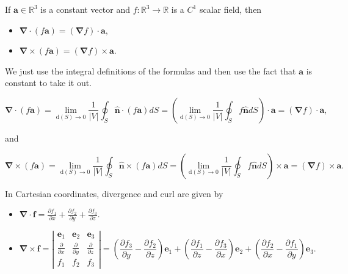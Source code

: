 \begin{lemma}
  If \(\boldsymbol{a} \in \mathbb{R}^3\) is a constant vector and \(f: \mathbb{R}^3 \rightarrow \mathbb{R}\) is a \(C^1\) scalar field, then
\begin{itemize}
\item[(i)] \(\boldsymbol{\nabla} \cdot(f \boldsymbol{a})=(\boldsymbol{\nabla} f) \cdot \boldsymbol{a}\),
\item[(ii)] \(\boldsymbol{\nabla} \times(f \boldsymbol{a})=(\boldsymbol{\nabla} f) \times \boldsymbol{a}\).
\end{itemize}
\end{lemma}

\begin{proofidea}
  
  We just use the integral definitions of the formulas and then use the fact that \(\mathbf{a}\) is constant to take it out.

\end{proofidea}
  
\begin{formalproof}
  
\[
\boldsymbol{\nabla} \cdot(f \boldsymbol{a})=\lim _{\mathrm{d}(S) \rightarrow 0} \frac{1}{|V|} \oint_S \hat{\boldsymbol{n}} \cdot(f \boldsymbol{a}) d S=\left(\lim _{\mathrm{d}(S) \rightarrow 0} \frac{1}{|V|} \oint_S f \hat{\boldsymbol{n}} d S\right) \cdot \boldsymbol{a}=(\boldsymbol{\nabla} f) \cdot \boldsymbol{a},
\]

and

\[
\boldsymbol{\nabla} \times(f \boldsymbol{a})=\lim _{\mathrm{d}(S) \rightarrow 0} \frac{1}{|V|} \oint_S \hat{\boldsymbol{n}} \times(f \boldsymbol{a}) d S=\left(\lim _{\mathrm{d}(S) \rightarrow 0} \frac{1}{|V|} \oint_S f \hat{\boldsymbol{n}} d S\right) \times \boldsymbol{a}=(\boldsymbol{\nabla} f) \times \boldsymbol{a} .
\]

\end{formalproof}

\begin{proposition}
  In Cartesian coordinates, divergence and curl are given by
\begin{itemize}
\item[(i)] \(\boldsymbol{\nabla} \cdot \boldsymbol{f}=\frac{\partial f_1}{\partial x}+\frac{\partial f_2}{\partial y}+\frac{\partial f_3}{\partial z}\).
\item[(ii)]

\[
\boldsymbol{\nabla} \times \boldsymbol{f}=\left|\begin{array}{ccc}
\boldsymbol{e}_1 & \boldsymbol{e}_2 & \boldsymbol{e}_3 \\
\frac{\partial}{\partial x} & \frac{\partial}{\partial y} & \frac{\partial}{\partial z} \\
f_1 & f_2 & f_3
\end{array}\right|=\left(\frac{\partial f_3}{\partial y}-\frac{\partial f_2}{\partial z}\right) \boldsymbol{e}_1+\left(\frac{\partial f_1}{\partial z}-\frac{\partial f_3}{\partial x}\right) \boldsymbol{e}_2+\left(\frac{\partial f_2}{\partial x}-\frac{\partial f_1}{\partial y}\right) \boldsymbol{e}_3 .
\]
\end{itemize}
\end{proposition}

